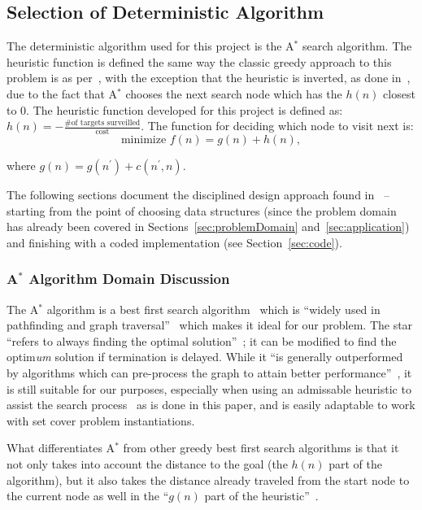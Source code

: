 \documentclass[conference]{IEEEtran}
\newcommand{\heuristic}{${h(n) = -\frac{\text{\# of targets
surveilled}}{\text{cost}}}$}
\begin{document}
\subsection{Selection of Deterministic Algorithm} \label{sec:detAlg}

The deterministic algorithm used for this project is the A$^*$ search
algorithm. The heuristic function is defined the same way the classic greedy
approach to this problem is as per~\cite{wiki:SCP}, with the exception that the
heuristic is inverted, as done in~\cite{pjcvphw8}, due to the fact that A$^*$
chooses the next search node which has the $h(n)$ closest to $0$.  The
heuristic function developed for this project is defined as: \heuristic.  The
function for deciding which node to visit next is: \[ \text{minimize } f(n) =
g(n) + h(n), \]

\noindent where $g(n) = g(n^\prime) + c(n^\prime,n)$.

The following sections document the disciplined design approach found
in~\cite{lamontSCP, lamontDesign, lamontMIS} -- starting from the point of
choosing data structures (since the problem domain has already been covered in
Sections~\ref{sec:problemDomain} and~\ref{sec:application}) and finishing with
a coded implementation (see Section~\ref{sec:code}).

\subsubsection{A$^*$ Algorithm Domain Discussion}

The A$^*$ algorithm is a best first search algorithm~\cite{lamontBFS,
pearl1984} which is ``widely used in pathfinding and graph
traversal''~\cite{wiki:astar} which makes it ideal for our problem. The star
``refers to always finding the optimal solution''~\cite{lamontBFS}; it can be
modified to find the optim\emph{um} solution if termination is delayed. While
it ``is generally outperformed by algorithms which can pre-process the graph to
attain better performance''~\cite{wiki:astar}, it is still suitable for our
purposes, especially when using an admissable heuristic to assist the search
process~\cite{pearl1984} as is done in this paper, and is easily adaptable to
work with set cover problem instantiations. 

What differentiates A$^*$ from other greedy best first search algorithms is
that it not only takes into account the distance to the goal (the $h(n)$
part of the algorithm), but it also takes the distance already
traveled from the start node to the current node as well in the ``$g(n)$ part of
the heuristic''~\cite{lamontBFS}.
\end{document}
